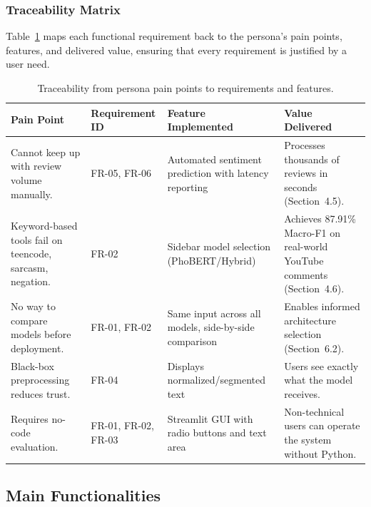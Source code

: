 \documentclass[12pt]{report} %
\begin{document}
\subsubsection{Traceability Matrix}

Table~\ref{tab:traceability} maps each functional requirement back to the persona's pain points, features, and delivered value, ensuring that every requirement is justified by a user need.

\begin{table}[H]
    \centering
    \caption{Traceability from persona pain points to requirements and features.}
    \label{tab:traceability}
    \begin{tabular}{p{3cm}p{3.2cm}p{2.2cm}p{3.2cm}}
        \hline
        \textbf{Pain Point}                                      & \textbf{Requirement ID} & \textbf{Feature Implemented}                          & \textbf{Value Delivered}                                                \\
        \hline
        Cannot keep up with review volume manually.              & FR-05, FR-06            & Automated sentiment prediction with latency reporting & Processes thousands of reviews in seconds (Section~4.5).                \\
        Keyword-based tools fail on teencode, sarcasm, negation. & FR-02                   & Sidebar model selection (PhoBERT/Hybrid)              & Achieves 87.91\% Macro-F1 on real-world YouTube comments (Section~4.6). \\
        No way to compare models before deployment.              & FR-01, FR-02            & Same input across all models, side-by-side comparison & Enables informed architecture selection (Section~6.2).                  \\
        Black-box preprocessing reduces trust.                   & FR-04                   & Displays normalized/segmented text                    & Users see exactly what the model receives.                              \\
        Requires no-code evaluation.                             & FR-01, FR-02, FR-03     & Streamlit GUI with radio buttons and text area        & Non-technical users can operate the system without Python.              \\
        \hline
    \end{tabular}
\end{table}

\subsection{Main Functionalities}
\end{document}
